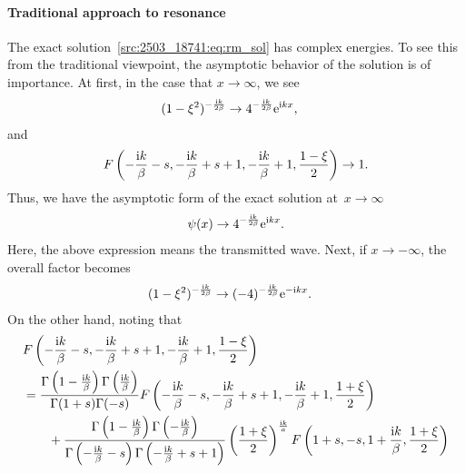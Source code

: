 \paragraph{Traditional approach to resonance}\label{src:2503_18741:sec:rm_resonance}
The exact solution~\eqref{src:2503_18741:eq:rm_sol} has complex energies.
To see this from the traditional viewpoint,
the asymptotic behavior of the solution is of importance.
At first, in the case that $x\to\infty$, we see
\begin{align}
    (1-\xi^2)^{-\frac{\mathrm{i} k}{2\beta}}
    &\to 
    4^{-\frac{\mathrm{i} k}{2\beta}} \mathrm{e}^{\mathrm{i} kx}, 
\end{align}
and
\begin{align}
    F\left( -\frac{\mathrm{i} k}{\beta}-s, -\frac{\mathrm{i} k}{\beta}+s+1, -\frac{\mathrm{i} k}{\beta}+1, \frac{1-\xi}{2} \right)  
    \to 1 .
\end{align}
Thus, we have the asymptotic form of the exact solution at~$x\to\infty$
\begin{align}
    \psi(x) \rightarrow  4^{-\frac{\mathrm{i} k}{2\beta}} \mathrm{e}^{\mathrm{i} kx} .
\end{align}
Here, the above expression means the transmitted wave.
Next, if $x\to-\infty$, the overall factor becomes
\begin{align}
    (1-\xi^2)^{-\frac{\mathrm{i} k}{2\beta}}
    &\to
    (-4)^{-\frac{\mathrm{i} k}{2\beta}} \mathrm{e}^{-\mathrm{i} kx} .
\end{align}
On the other hand, noting that
\begin{align}
    &F\left( -\frac{\mathrm{i} k}{\beta}-s, -\frac{\mathrm{i} k}{\beta}+s+1, -\frac{\mathrm{i} k}{\beta}+1, \frac{1-\xi}{2} \right) 
    \notag \\
    &=
    \frac{\Gamma\left(1-\frac{\mathrm{i} k}{\beta}\right) \Gamma\left(\frac{\mathrm{i} k}{\beta}\right)}{\Gamma(1+s) \Gamma(-s)}
    F\left( -\frac{\mathrm{i} k}{\beta}-s, -\frac{\mathrm{i} k}{\beta}+s+1, -\frac{\mathrm{i} k}{\beta}+1, \frac{1+\xi}{2} \right) 
    \notag \\
    &\qquad +
    \frac{\Gamma\left(1-\frac{\mathrm{i} k}{\beta}\right) \Gamma\left(-\frac{\mathrm{i} k}{\beta}\right)}
    {\Gamma\left(-\frac{\mathrm{i} k}{\beta}-s\right) \Gamma\left(-\frac{\mathrm{i} k}{\beta}+s+1\right)}
    \left(\frac{1+\xi}{2}\right)^{\frac{\mathrm{i} k}{a}}
    F\left( 1+s, -s, 1+\frac{\mathrm{i} k}{\beta}, \frac{1+\xi}{2} \right) 
\end{align}
